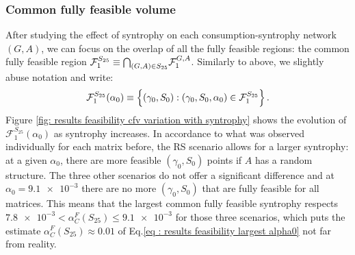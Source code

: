 \documentclass[12pt, titlepage]{report}
\begin{document}
  \subsubsection{Common fully feasible volume}
 After studying the effect of syntrophy on each consumption-syntrophy network $(G,A)$, we can focus on the overlap of all the fully feasible regions: the common fully feasible region $\mathcal{F}_1^{S_{25}}\equiv {\bigcap}_{(G,A)\in S_{25}} \mathcal{F}^{G,A}_1$. Similarly to above, we slightly abuse notation and write:
\begin{equation}
\mathcal{F}_1^{S_{25}}(\alpha_0) \equiv \left\{(\gamma_0, S_0) : (\gamma_0, S_0, \alpha_0) \in \mathcal{F}_1^{S_{25}}\right\}.
\end{equation}
 Figure \ref{fig: results feasibility cfv variation with syntrophy} shows the evolution of $\mathcal{F}_1^{S_{25}}(\alpha_0)$ as syntrophy increases. %
 In accordance to what was observed individually for each matrix before, the RS scenario allows for a larger syntrophy: at a given $\alpha_0$, there are more feasible $(\gamma_0, S_0)$ points if $A$ has a random structure. The three other scenarios do not offer a significant difference and at $\alpha_0=\num{9.1e-3}$ there are no more $(\gamma_0, S_0)$ that are fully feasible for all matrices. This means that the largest common fully feasible syntrophy respects $\num{7.8e-3}<\alpha_C^F(S_{25}) \leq \num{9.1e-3}$ for those three scenarios, which puts the estimate $\alpha_C^F(S_{25}) \approx 0.01$ of Eq.\eqref{eq : results feasibility largest alpha0} not far from reality.
\end{document}
